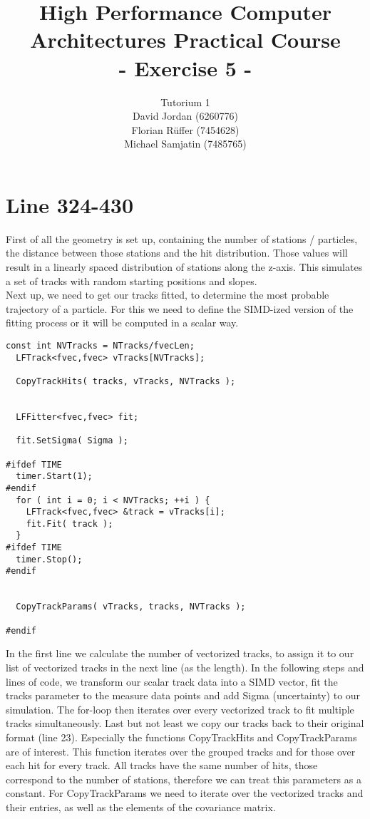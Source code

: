 \documentclass{article}
\title{\textbf{High Performance Computer Architectures Practical Course \\ - Exercise 5 -} \\[10mm]}
\author{Tutorium 1 \\[10mm] David Jordan (6260776) \\[1mm] Florian Rüffer (7454628) \\[1mm] Michael Samjatin (7485765) \\[10mm]}
\begin{document}
\maketitle
\newpage
\section*{Line 324-430}
First of all the geometry is set up, containing the number of stations / particles, the distance between those stations and the hit distribution.
Those values will result in a linearly spaced distribution of stations along the z-axis.
This simulates a set of tracks with random starting positions and slopes. \\

\noindent Next up, we need to get our tracks fitted, to determine the most probable
trajectory of a particle. For this we need to define the SIMD-ized version of the fitting process or
it will be computed in a scalar way.

\begin{lstlisting}[caption=KFLineFitter.cpp]
  const int NVTracks = NTracks/fvecLen;
  LFTrack<fvec,fvec> vTracks[NVTracks];
  
  CopyTrackHits( tracks, vTracks, NVTracks );
  
    
  LFFitter<fvec,fvec> fit;

  fit.SetSigma( Sigma );
  
#ifdef TIME
  timer.Start(1);
#endif
  for ( int i = 0; i < NVTracks; ++i ) {
    LFTrack<fvec,fvec> &track = vTracks[i];
    fit.Fit( track );
  }
#ifdef TIME
  timer.Stop();
#endif
  
    
  CopyTrackParams( vTracks, tracks, NVTracks );
  
#endif
\end{lstlisting}

\noindent In the first line we calculate the number of vectorized tracks, to assign it to our
list of vectorized tracks in the next line (as the length). In the following steps and lines of code,
we transform our scalar track data into a SIMD vector, fit the tracks parameter to the measure data points
and add Sigma (uncertainty) to our simulation.
The for-loop then iterates over every vectorized track to fit multiple tracks simultaneously.
Last but not least we copy our tracks back to their original format (line 23).
Especially the functions CopyTrackHits and CopyTrackParams are of interest.
This function iterates over the grouped tracks and for those over each hit for every track.
All tracks have the same number of hits, those correspond to the number of stations, therefore
we can treat this parameters as a constant.
For CopyTrackParams we need to iterate over the vectorized tracks and their entries, as well as the
elements of the covariance matrix. \\
\end{document}
